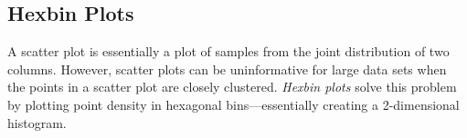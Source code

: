 \subsection*{Hexbin Plots} %

A scatter plot is essentially a plot of samples from the joint distribution of two columns.
However, scatter plots can be uninformative for large data sets when the points in a scatter plot are closely clustered.
\emph{Hexbin plots} solve this problem by plotting point density in hexagonal bins---essentially creating a 2-dimensional histogram.

